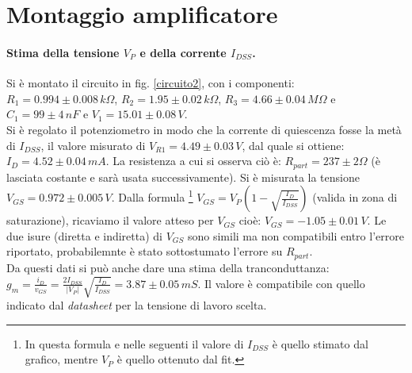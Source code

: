 \documentclass[10pt,a4paper]{article}
\begin{document}
\section{Montaggio amplificatore}

\paragraph{Stima della tensione $V_P$ e della corrente $I_{DSS}$.}
Si è montato il circuito in fig. \ref{circuito2}, con i componenti: $R_1 = 0.994\pm0.008 \, k\Omega $, $R_2 = 1.95\pm0.02 \, k \Omega $, $R_3 = 4.66 \pm 0.04 \, M \Omega$ e $C_1 = 99\pm4 \, nF$ e $V_1 = 15.01\pm0.08 \, V$. \\
Si è regolato il potenziometro in modo che la corrente di quiescenza fosse la metà di $I_{DSS}$, il valore misurato di $V_{R1} = 4.49 \pm 0.03 \, V$, dal quale si ottiene: $I_D = 4.52\pm0.04\,mA$. La resistenza a cui si osserva ciò è: $R_{part} = 237\pm2 \Omega$ (è lasciata costante e sarà usata successivamente). Si è misurata la tensione $V_{GS} = 0.972 \pm 0.005 \,V$. Dalla formula \footnote{In questa formula e nelle seguenti il valore di $I_{DSS}$ è quello stimato dal grafico, mentre $V_P$ è quello ottenuto dal fit.} $V_{GS} = V_{P} \left( 1 - \sqrt{\frac{I_D}{I_{DSS}}} \right)$ (valida in zona di saturazione), ricaviamo il valore atteso per $V_{GS}$ cioè: $V_{GS} = -1.05\pm0.01 \, V$. Le due isure (diretta e indiretta) di $V_{GS}$ sono simili ma non compatibili entro l'errore riportato, probabilemnte è stato sottostumato l'errore su $R_{part}$. \\
Da questi dati si può anche dare una stima della tranconduttanza: $g_m = \frac{i_D}{v_{GS}} = \frac{2I_{DSS}}{\vert V_P \vert} \sqrt{\frac{I_D}{I_{DSS}}} = 3.87\pm0.05\,mS$. Il valore è compatibile con quello indicato dal \emph{datasheet} per la tensione di lavoro scelta.
\end{document}
